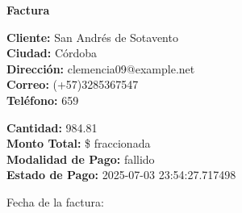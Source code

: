 \documentclass{article}
\begin{document}
\begin{center}
    {\LARGE \textbf{Factura}}\\[1cm]
\end{center}

\textbf{Cliente:} San Andrés de Sotavento \\
\textbf{Ciudad:} Córdoba \\
\textbf{Dirección:} clemencia09@example.net \\
\textbf{Correo:} (+57)3285367547 \\
\textbf{Teléfono:} 659 \\

\vspace{0.5cm}

\textbf{Cantidad:} 984.81 \\
\textbf{Monto Total:} \$ fraccionada \\
\textbf{Modalidad de Pago:} fallido \\
\textbf{Estado de Pago:} 2025-07-03 23:54:27.717498 \\

\vspace{1cm}

Fecha de la factura: 
\end{document}
